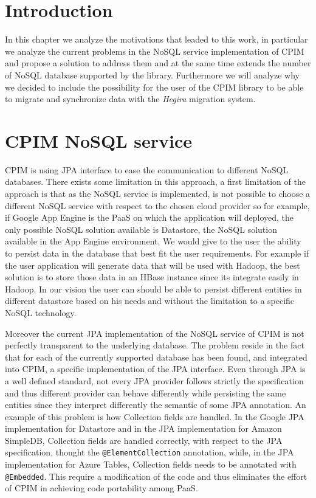\section{Introduction}
In this chapter we analyze the motivations that leaded to this work, in particular we analyze the current problems in the NoSQL service implementation of CPIM and propose a solution to address them and at the same time extends the number of NoSQL database supported by the library.
\noindent Furthermore we will analyze why we decided to include the possibility for the user of the CPIM library to be able to migrate and synchronize data with the \textit{Hegira} migration system.

\section{CPIM NoSQL service}
CPIM is using JPA interface to ease the communication to different NoSQL databases. There exists some limitation in this approach, a first limitation of the approach is that as the NoSQL service is implemented, is not possible to choose a different NoSQL service with respect to the chosen cloud provider so for example, if Google App Engine is the PaaS on which the application will deployed, the only possible NoSQL solution available is Datastore, the NoSQL solution available in the App Engine environment.
We would give to the user the ability to persist data in the database that best fit the user requirements. For example if the user application will generate data that will be used with Hadoop, the best solution is to store those data in an HBase instance since its integrate easily in Hadoop.
In our vision the user can should be able to persist different entities in different datastore based on his needs and without the limitation to a specific NoSQL technology.

\noindent Moreover the current JPA implementation of the NoSQL service of CPIM is not perfectly transparent to the underlying database. The problem reside in the fact that for each of the currently supported database has been found, and integrated into CPIM, a specific implementation of the JPA interface. Even through JPA is a well defined standard, not every JPA provider follows strictly the specification and thus different provider can behave differently while persisting the same entities since they interpret differently the semantic of some JPA annotation.
An example of this problem is how Collection fields are handled. In the Google JPA implementation for Datastore and in the JPA implementation for Amazon SimpleDB, Collection fields are handled correctly, with respect to the JPA specification, thought the \texttt{@ElementCollection} annotation, while, in the JPA implementation for Azure Tables, Collection fields needs to be annotated with \texttt{@Embedded}. This require a modification of the code and thus eliminates the effort of CPIM in achieving code portability among PaaS.

